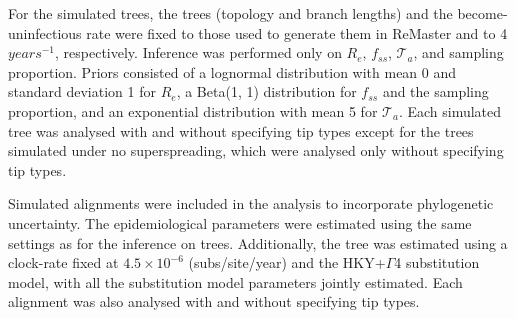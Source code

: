 \documentclass[lineno,pdflatex,sn-nature]{sn-jnl}%
\theoremstyle{thmstyleone}%
\theoremstyle{thmstyletwo}%
\theoremstyle{thmstylethree}%
\begin{document}
For the simulated trees, the trees (topology and branch lengths) and the become-uninfectious rate were fixed to those used to generate them in ReMaster and to 4 $years^{-1}$, respectively. Inference was performed only on $R_e$, $f_{ss}$, $\mathcal{T}_a$, and sampling proportion. Priors consisted of a lognormal distribution with mean 0 and standard deviation 1 for $R_e$, a Beta(1, 1) distribution for $f_{ss}$ and the sampling proportion, and an exponential distribution with mean 5 for $\mathcal{T}_a$. Each simulated tree was analysed with and without specifying tip types except for the trees simulated under no superspreading, which were analysed only without specifying tip types.\newline

Simulated alignments were included in the analysis to incorporate phylogenetic uncertainty. The epidemiological parameters were estimated using the same settings as for the inference on trees. Additionally, the tree was estimated using a clock-rate fixed at $4.5 \times 10^{-6}$ (subs/site/year) and the HKY+$\Gamma$4 substitution model, with all the substitution model parameters jointly estimated. Each alignment was also analysed with and without specifying tip types.\newline
\end{document}
